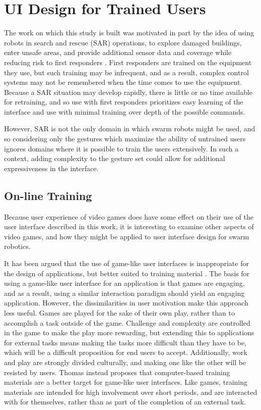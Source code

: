 \chapter{UI Design for Trained Users}
\thispagestyle{fancy}

The work on which this study is built was motivated in part by the idea of using robots in search and rescue (SAR) operations, to explore damaged buildings, enter unsafe areas, and provide additional sensor data and coverage while reducing risk to first responders \citep{micire2010multi}.
First responders are trained on the equipment they use, but such training may be infrequent, and as a result, complex control systems may not be remembered when the time comes to use the equipment. 
Because a SAR situation may develop rapidly, there is little or no time available for retraining, and so use with first responders prioritizes easy learning of the interface and use with minimal training over depth of the possible commands.  

However, SAR is not the only domain in which swarm robots might be used, and so considering only the gestures which maximize the ability of untrained users ignores domains where it is possible to train the users extensively. 
In such a context, adding complexity to the gesture set could allow for additional expressiveness in the interface.

\section{On-line Training}

Because user experience of video games does have some effect on their use of the user interface described in this work, it is interesting to examine other aspects of video games, and how they might be applied to user interface design for swarm robotics. 

It has been argued that the use of game-like user interfaces is inappropriate for the design of applications, but better suited to training material \citep{thomas1994games}. The basis for using a game-like user interface for an application is that games are engaging, and as a result, using a similar interaction paradigm should yield an engaging application. 
However, the dissimilarities in user motivation make this approach less useful. 
Games are played for the sake of their own play, rather than to accomplish a task outside of the game. 
Challenge and complexity are controlled in the game to make the play more rewarding, but extending this to applications for external tasks means making the tasks more difficult than they have to be, which will be a difficult proposition for end users to accept. 
Additionally, work and play are strongly divided culturally, and making one like the other will be resisted by users. 
Thomas instead proposes that computer-based training materials are a better target for game-like user interfaces. 
Like games, training materials are intended for high involvement over short periods, and are interacted with for themselves, rather than as part of the completion of an external task. 

